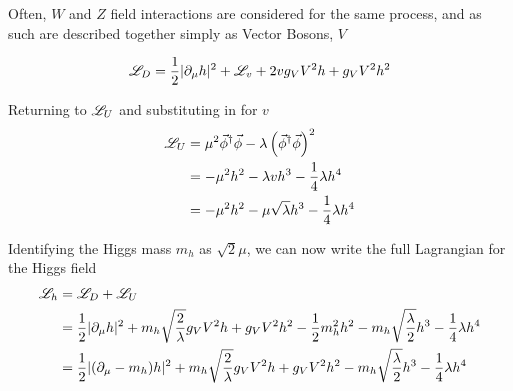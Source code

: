         Often, $W$ and $Z$ field interactions are considered for the same process,
            and as such are described together simply as Vector Bosons, $V$

        \begin{equation} \begin{split}
            \mathscr{L}_D = \frac{1}{2} | \partial_{\mu}h |^2 + \mathscr{L}_v
                + 2 v g_V V^2 h + g_V V^2 h^2
        \end{split} \end{equation}

        Returning to $\mathscr{L}_U$ and substituting in for $v$
        \begin{equation} \begin{split}
            \mathscr{L}_U &= \mu^2 \vec{\phi}^\dag \vec{\phi} - \lambda \left( \vec{\phi}^\dag\vec{\phi} \right)^2
            \\&= - \mu^2 h^2 -\lambda v h^3 - \frac{1}{4} \lambda h^4
            \\&= - \mu^2 h^2 - \mu \sqrt\lambda h^3 - \frac{1}{4} \lambda h^4
        \end{split} \end{equation}

        Identifying the Higgs mass $m_h$ as $\sqrt{2}\mu$, we can now write the full Lagrangian for the Higgs field
        \begin{equation} \begin{split}
            \mathscr{L}_h &= \mathscr{L}_D + \mathscr{L}_U
            \\&= \frac{1}{2} | \partial_{\mu}h |^2
                + m_h \sqrt{\frac{2}{\lambda}}  g_V V^2 h + g_V V^2 h^2
                - \frac{1}{2} m^2_h h^2 - m_h \sqrt{\frac{\lambda}{2}} h^3 - \frac{1}{4} \lambda h^4
            \\&= \frac{1}{2} | (\partial_{\mu} -m_h) h |^2
                + m_h \sqrt{\frac{2}{\lambda}}  g_V V^2 h + g_V V^2 h^2
                - m_h \sqrt{\frac{\lambda}{2}} h^3 - \frac{1}{4} \lambda h^4
        \end{split} \end{equation}





        
        

